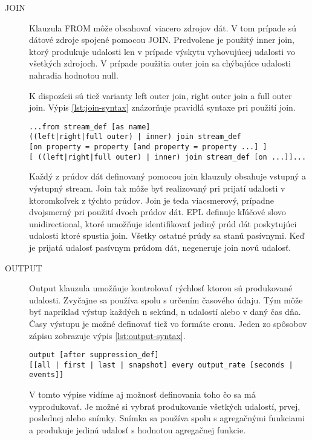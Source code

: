 \begin{description}
			\item[JOIN] Klauzula FROM môže obsahovať viacero zdrojov dát. V tom prípade sú dátové zdroje spojené pomocou JOIN. Predvolene je použitý inner join, ktorý produkuje udalosti len v prípade výskytu vyhovujúcej udalosti vo všetkých zdrojoch. V prípade použitia outer join sa chýbajúce udalosti nahradia hodnotou null.
	
			K dispozícii sú tiež varianty left outer join, right outer join a full outer join. Výpis \ref{lst:join-syntax} znázorňuje pravidlá syntaxe pri použití join.
			\begin{lstlisting}[label=lst:join-syntax]
...from stream_def [as name] 
((left|right|full outer) | inner) join stream_def 
[on property = property [and property = property ...] ]
[ ((left|right|full outer) | inner) join stream_def [on ...]]...
			\end{lstlisting}
			Každý z prúdov dát definovaný pomocou join klauzuly obsahuje vstupný a výstupný stream. Join tak môže byť realizovaný pri prijatí udalosti v ktoromkoľvek z týchto prúdov. Join je teda viacsmerový, prípadne dvojsmerný pri použití dvoch prúdov dát.
			EPL definuje kľúčové slovo unidirectional, ktoré umožňuje identifikovať jediný prúd dát poskytujúci udalosti ktoré spustia join. Všetky ostatné prúdy sa stanú pasívnymi. Keď je prijatá udalosť pasívnym prúdom dát, negeneruje join novú udalosť.
	
			\item[OUTPUT] Output klauzula umožňuje kontrolovať rýchlosť ktorou sú produkované udalosti. Zvyčajne sa používa spolu s určením časového údaju. Tým môže byť napríklad výstup každých n sekúnd, n udalostí alebo v daný čas dňa. Časy výstupu je možné definovať tiež vo formáte cronu. Jeden zo spôsobov zápisu zobrazuje výpis \ref{lst:output-syntax}.
			\begin{lstlisting}[label=lst:output-syntax]
output [after suppression_def] 
[[all | first | last | snapshot] every output_rate [seconds | events]]
			\end{lstlisting}
			V tomto výpise vidíme aj možnosť definovania toho čo sa má vyprodukovať. Je možné si vybrať produkovanie všetkých udalostí, prvej, poslednej alebo snímky. Snímka sa používa spolu s agregačnými funkciami a produkuje jedinú udalosť s hodnotou agregačnej funkcie.
		\end{description}

